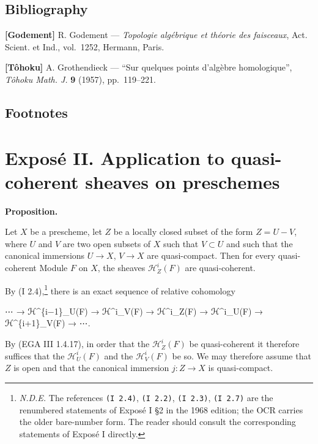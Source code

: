 \documentclass[
]{article}
\newenvironment{Shaded}{}{}
\newcommand{\NormalTok}[1]{#1}
\begin{document}
\subsection{Bibliography}\label{bibliography}

\textbf{{[}Godement{]}} R. Godement --- \emph{Topologie algébrique et
théorie des faisceaux}, Act. Scient. et Ind., vol.~1252, Hermann, Paris.

\textbf{{[}Tôhoku{]}} A. Grothendieck --- ``Sur quelques points
d'algèbre homologique'', \emph{Tôhoku Math. J.} \textbf{9} (1957),
pp.~119--221.

\subsection{Footnotes}\label{footnotes}

\section{Exposé II. Application to quasi-coherent sheaves on
preschemes}\label{exposuxe9-ii.-application-to-quasi-coherent-sheaves-on-preschemes}

\textbf{Proposition.}

Let \(X\) be a prescheme, let \(Z\) be a locally closed subset of the
form \(Z = U - V\), where \(U\) and \(V\) are two open subsets of \(X\)
such that \(V \subset U\) and such that the canonical immersions
\(U \to X\), \(V \to X\) are quasi-compact. Then for every
quasi-coherent Module \(F\) on \(X\), the sheaves
\(\mathcal{H}^{i}_{Z}(F)\) are quasi-coherent.

By (I 2.4),\footnote{\emph{N.D.E.} The references \texttt{(I\ 2.4)},
  \texttt{(I\ 2.2)}, \texttt{(I\ 2.3)}, \texttt{(I\ 2.7)} are the
  renumbered statements of Exposé I §2 in the 1968 edition; the OCR
  carries the older bare-number form. The reader should consult the
  corresponding statements of Exposé I directly.} there is an exact
sequence of relative cohomology

\begin{Shaded}
\begin{Highlighting}[]
\NormalTok{⋯ → ℋ\^{}\{i−1\}\_U(F) → ℋ\^{}i\_V(F) → ℋ\^{}i\_Z(F) → ℋ\^{}i\_U(F) → ℋ\^{}\{i+1\}\_V(F) → ⋯.}
\end{Highlighting}
\end{Shaded}

By (EGA III 1.4.17), in order that the \(\mathcal{H}^{i}_{Z}(F)\) be
quasi-coherent it therefore suffices that the \(\mathcal{H}^{i}_{U}(F)\)
and the \(\mathcal{H}^{i}_{V}(F)\) be so. We may therefore assume that
\(Z\) is open and that the canonical immersion \(j: Z \to X\) is
quasi-compact.
\end{document}
